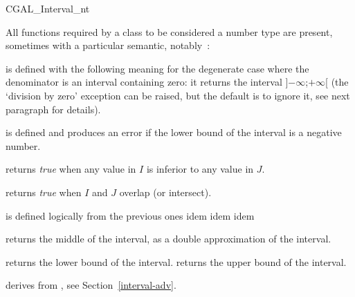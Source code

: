 \begin{ccClass} {CGAL_Interval_nt}



\ccOperations
{}

All functions required by a class to be considered a {\cgal} number type are
present, sometimes with a particular semantic, notably~:


 {is defined with the
following meaning for the degenerate case where the denominator is an interval
containing zero: it returns the interval ]$-\infty$;$+\infty$[ (the `division
by zero' exception can be raised, but the default is to ignore it, see next
paragraph for details).}

 {is defined and
produces an error if the lower bound of the interval is a negative number.}

 {returns {\it true} when any
value in $I$ is inferior to any value in $J$.}

 {returns {\it true} when $I$
and $J$ overlap (or intersect).}

 {is defined logically from the
previous ones}
 {idem}
 {idem}
 {idem}

 {returns the
middle of the interval, as a double approximation of the interval.}

 {returns the lower bound of the interval.}
 {returns the upper bound of the interval.}

\ccImplementation

 derives from , 
see Section~\ref{interval-adv}.

\ccExample


\end{ccClass}
